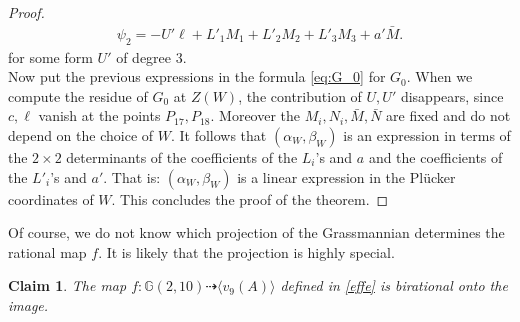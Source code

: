 \documentclass{amsart}
\newcommand{\G}{\mathbb{G}}
\newtheorem{claim0}[thm0]{Claim}
\theoremstyle{definition}
\begin{document}
\begin{proof}
\begin{gather*}
		\psi_2   = -U'\ell +L'_1M_1+L'_2M_2+L'_3M_3+a'\bar M. 
\end{gather*}
for some form $U'$ of degree $3$.\\
Now put the previous expressions in the formula \eqref{eq:G_0} for $G_0$. When we compute the residue of $G_0$ at $Z(W)$,
the contribution of $U,U'$ disappears, since $c,\ell$ vanish at the points $P_{17},P_{18}$. Moreover the $M_i,N_i,\bar M,\bar N$ are fixed and do
not depend on the choice of $W$. It follows that $(\alpha_W,\beta_W)$ is an expression in terms of the $2\times 2$ determinants of the coefficients
of the $L_i$'s and $a$ and the coefficients of the $L'_i$'s and $a'$. That is: $(\alpha_W,\beta_W)$ is a linear expression
in the Pl\"ucker coordinates of $W$. This concludes the proof of the theorem.
\end{proof}

Of course, we do not know which projection of the Grassmannian determines the rational map $f$. It is likely that the projection is highly special.

\begin{claim0}\label{thm:bir}
The map $f : \G(2,10) \dasharrow \langle v_9(A) \rangle $ defined in \eqref{effe} is birational onto the image.
\end{claim0}
\end{document}
